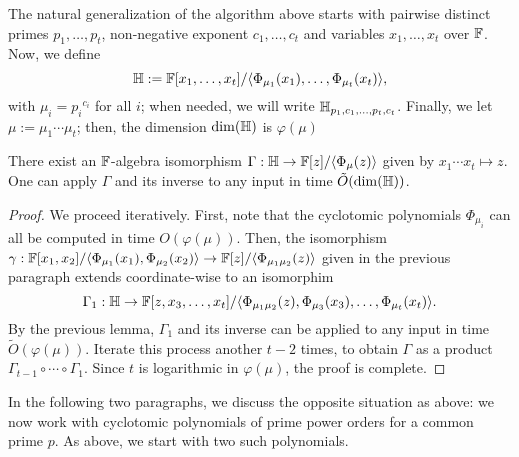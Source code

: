   The
natural generalization of the algorithm above starts with pairwise
distinct primes $p_1,\dots,p_t$, non-negative exponent $c_1,\dots,c_t$
and variables $x_1,\dots,x_t$ over $\mathbb{F}$. Now, we define
$$\mathbb{H}:=\mathbb{F}[x_1,\dots,x_t]/\langle
\Phi_{\mu_1}(x_1),\dots,\Phi_{\mu_t}(x_t)\rangle,$$ with
$\mu_i={p_i}^{c_i}$ for all $i$; when needed, we will write
$\mathbb{H}_{p_1,c_1,\dots,p_t,c_t}$. Finally, we let  $\mu:=\mu_1\cdots \mu_t$;
then, the dimension $\dim(\mathbb{H})$ is $\varphi(\mu)$

\begin{lemma}
 There exist an $\mathbb{F}$-algebra isomorphism $\Gamma: \mathbb{H} \to
 \mathbb{F}[z]/\langle\Phi_{\mu}(z)\rangle$ given by $x_1 \cdots x_t \mapsto
 z$.  One can apply $\Gamma$ and its inverse to any input in time
 $\tilde{O}(\dim(\mathbb{H}))$.
\end{lemma}
\begin{proof}
  We proceed iteratively. First, note that the cyclotomic polynomials
  $\Phi_{\mu_i}$ can all be computed in time $O(\varphi(\mu))$. 
  Then, the isomorphism
  $\gamma: \mathbb{F}[x_1,x_2]/\langle \Phi_{\mu_1}(x_1),
  \Phi_{\mu_2}(x_2)\rangle \to \mathbb{F}[z]/\langle
  \Phi_{\mu_1\mu_2}(z)\rangle$
given in the previous paragraph extends coordinate-wise to an
  isomorphim
  $$\Gamma_1: \mathbb{H} \to \mathbb{F}[z,x_3,\dots,x_t]/\langle
  \Phi_{\mu_1\mu_2}(z),\Phi_{\mu_3}(x_3),\dots,\Phi_{\mu_t}(x_t)\rangle.$$
  By the previous lemma, $\Gamma_1$ and its inverse can be applied to
  any input in time $\tilde{O}(\varphi(\mu))$. Iterate this process
  another $t-2$ times, to obtain $\Gamma$ as a product
  $\Gamma_{t-1} \circ \cdots \circ \Gamma_1$. Since $t$ is logarithmic 
  in $\varphi(\mu)$, the proof is complete.
\end{proof}

In the following two paragraphs, we discuss the opposite situation as
above: we now work with cyclotomic polynomials of prime power
orders for a common prime $p$. As above, we start with two such polynomials.

